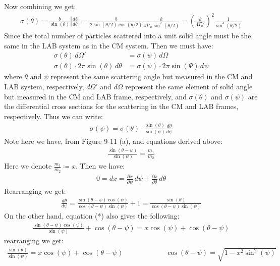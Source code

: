 \documentclass[11pt,oneside]{book}
\theoremstyle{break}
\theoremstyle{break}
\begin{document}
Now combining we get:
\begin{align*}
\sigma(\theta) = \frac{b}{\sin(\theta)}\left| \frac{db}{d\theta}\right| = \frac{b}{2 \sin(\theta/2)\cos(\theta/2)} \frac{k}{4T'_0\sin^2(\theta/2)} = \left(\frac{k}{4T_0'} \right)^2 \frac{1}{\sin^4(\theta/2)}
\end{align*}
\newpage
Since the total number of particles scattered into a unit solid angle must be the same in the LAB system as in the CM system. Then we must have:
\begin{align*}
\sigma(\theta)\, d\Omega'& = \sigma(\psi)\, d\Omega\\
\sigma(\theta) \cdot 2\pi \sin(\theta)\, d\theta &= \sigma(\psi) \cdot 2\pi \sin(\Psi) \, d\psi
\end{align*}
where $\theta$ and $\psi$ represent the same scattering angle but measured in the CM and LAB system, respectively, $d\Omega'$ and $d\Omega$ represent the same element of solid angle but measured in the CM and LAB frame, respectively, and $\sigma(\theta)$ and $\sigma(\psi)$ are the differential cross sections for the scattering in the CM and LAB frames, respectively. Thus we can write:
\begin{align*}
\sigma(\psi) = \sigma(\theta) \cdot \frac{\sin(\theta)}{\sin(\psi)}\frac{d\theta}{d\psi}
\end{align*}
Note here we have, from Figure 9-11 (a), and equations derived above:
\begin{align*}
\frac{\sin(\theta-\psi)}{\sin(\psi)} = \frac{m_1}{m_2} \tag{*}
\end{align*} 
Here we denote $\frac{m_1}{m_2} \coloneqq x$. Then we have:
\begin{align*}
0 = dx = \frac{\partial x}{\partial \psi}\,d\psi + \frac{\partial x}{\partial \theta}\, d\theta
\end{align*}
Rearranging we get:
\begin{align*}
\frac{d\theta}{d\psi} = \frac{\sin(\theta - \psi) \cos(\psi)}{\cos(\theta - \psi) \sin(\psi)} + 1 = \frac{\sin(\theta)}{\cos(\theta-\psi) \sin(\psi)}
\end{align*}
On the other hand, equation (*) also gives the following:
\begin{align*}
\frac{\sin(\theta - \psi) \cos(\psi)}{\sin(\psi)}+ \cos(\theta - \psi) = x\cos(\psi) + \cos(\theta - \psi)
\end{align*}
rearranging we get:
\begin{align*}
\frac{\sin(\theta)}{\sin(\psi)} = x\cos(\psi) + \cos(\theta - \psi) \qquad \qquad \qquad \cos(\theta - \psi) = \sqrt{1-x^2 \sin^2(\psi)}
\end{align*}
\end{document}
